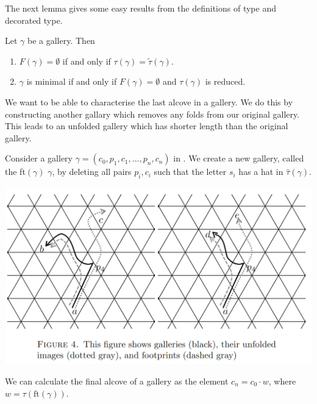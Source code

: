 \documentclass[11pt]{article}
\begin{document}
The next lemma gives some easy results from the definitions of type and decorated type. 

\begin{lemma}\cite[p.128]{SHA}
    Let $\gamma$ be a gallery. Then
    \begin{enumerate}
        \item $F(\gamma)=\emptyset$ if and only if $\tau(\gamma)=\tilde{\tau}(\gamma).$
        \item $\gamma$ is minimal if and only if $F(\gamma)=\emptyset$ and $\tau(\gamma)$ is reduced.
    \end{enumerate}
\end{lemma}

We want to be able to characterise the last alcove in a gallery. We do this by constructing another gallary which removes any folds from our original gallery. This leads to an unfolded gallery which has shorter length than the original gallery.

\begin{definition}
    Consider a gallery $\gamma = (c_0,p_1,c_1,...,p_n,c_n)$ in \sg. We create a new gallery, called the  ft$(\gamma)$  $\gamma$, by deleting all pairs $p_i,c_i$ such that the letter $s_i$ has a hat in $\hat{\tau}(\gamma)$. 

\end{definition}

\begin{center}
\includegraphics[scale=0.4]{Screenshot 2023-02-03 133522.png}\\
\end{center}

\begin{lemma}
    We can calculate the final alcove of a gallery as the element $c_n=c_0\cdot w$, where $w=\tau(\text{ft}(\gamma))$.
\end{lemma}
\end{document}
